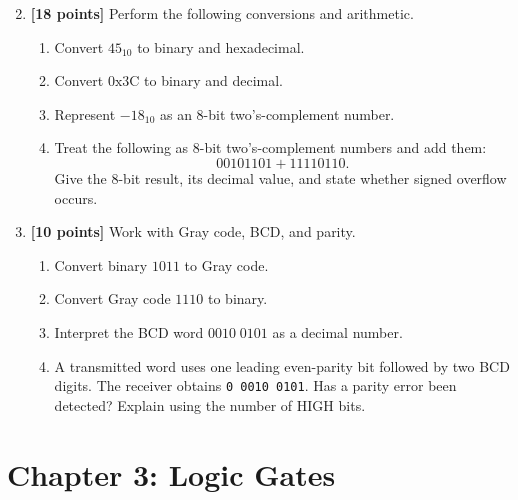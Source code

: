 \documentclass[11pt]{article}
\begin{document}
\begin{enumerate}
\setcounter{enumi}{1}

\item \textbf{[18 points]} Perform the following conversions and arithmetic.

\begin{enumerate}[label=(\alph*)]
    \item Convert $45_{10}$ to binary and hexadecimal.
    \item Convert $\mathrm{0x3C}$ to binary and decimal.
    \item Represent $-18_{10}$ as an 8-bit two's-complement number.
    \item Treat the following as 8-bit two's-complement numbers and add them:
    \begin{equation*}
        00101101 + 11110110.
    \end{equation*}
    Give the 8-bit result, its decimal value, and state whether signed overflow occurs.
\end{enumerate}

\vspace{5cm}

\item \textbf{[10 points]} Work with Gray code, BCD, and parity.

\begin{enumerate}[label=(\alph*)]
    \item Convert binary $1011$ to Gray code.
    \item Convert Gray code $1110$ to binary.
    \item Interpret the BCD word $0010\;0101$ as a decimal number.
    \item A transmitted word uses one leading even-parity bit followed by two BCD digits. The receiver obtains \texttt{0 0010 0101}.  Has a parity error been detected? Explain using the number of HIGH bits.
\end{enumerate}
\end{enumerate}

\vspace{3.5cm}

\section{Chapter 3: Logic Gates}
\end{document}
